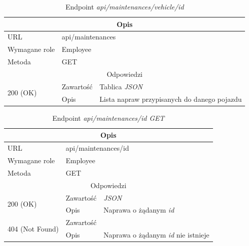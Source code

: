 \documentclass[eng,printmode,openany]{mgr}
\begin{document}
\begin{table}[H]
	\caption{Endpoint \textit{api/maintenances/vehicle/id}}
	\begin{tabularx}{\textwidth}{|l|l|X|}
		\hline
		\multicolumn{3}{|c|}{Opis}
		\\ \hline
		URL                         & \multicolumn{2}{l|}{api/maintenances}
		\\ \hline
		Wymagane role               & \multicolumn{2}{l|}{Employee}
		\\ \hline
		Metoda                      & \multicolumn{2}{l|}{GET}
		\\ \hline
		\multicolumn{3}{|c|}{ Odpowiedzi}
		\\ \hline
		\multirow{2}{*}{200 (OK)}   & Zawartość         & Tablica \textit{JSON}
		\\ \cline{2-3}              & Opis         	    & Lista napraw przypisanych do danego pojazdu
		\\ \hline
	\end{tabularx}
\end{table}

\begin{table}[H]
	\caption{Endpoint \textit{api/maintenances/id GET}}
	\begin{tabularx}{\textwidth}{|l|l|X|}
		\hline
		\multicolumn{3}{|c|}{Opis}
		\\ \hline
		URL                         & \multicolumn{2}{l|}{api/maintenances/id}
		\\ \hline
		Wymagane role               & \multicolumn{2}{l|}{Employee}
		\\ \hline
		Metoda                      & \multicolumn{2}{l|}{GET}
		\\ \hline
		\multicolumn{3}{|c|}{Odpowiedzi}
		\\ \hline
		\multirow{2}{*}{200 (OK)} 	        & Zawartość   	& \textit{JSON}
		\\ \cline{2-3}                      & Opis         	& Naprawa o żądanym \textit{id}
		\\ \hline
		\multirow{2}{*}{404 (Not Found)} 	& Zawartość     & 
		\\ \cline{2-3}                      & Opis          & Naprawa o żądanym \textit{id} nie istnieje
		\\ \hline
	\end{tabularx}
\end{table}
\end{document}

